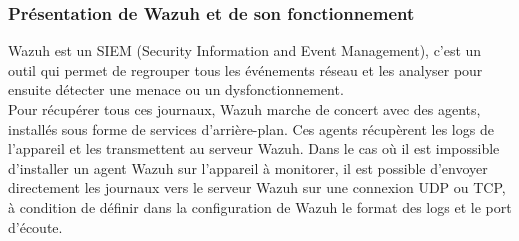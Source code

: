 \documentclass[a4paper, 11pt]{article}
\begin{document}
\subsubsection{Présentation de Wazuh et de son fonctionnement}
Wazuh est un SIEM (Security Information and Event Management), c'est un outil qui permet de regrouper tous les événements réseau et les analyser pour ensuite détecter une menace ou un dysfonctionnement.\\
Pour récupérer tous ces journaux, Wazuh marche de concert avec des agents, installés sous forme de services d'arrière-plan. Ces agents récupèrent les logs de l'appareil et les transmettent au serveur Wazuh. Dans le cas où il est impossible d'installer un agent Wazuh sur l'appareil à monitorer, il est possible d'envoyer directement les journaux vers le serveur Wazuh sur une connexion UDP ou TCP, à condition de définir dans la configuration de Wazuh le format des logs et le port d'écoute.\\
\\
\end{document}
